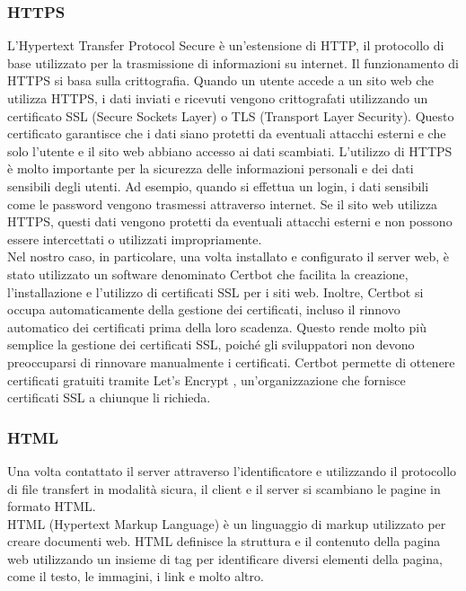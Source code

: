 \documentclass[a4paper,final,12pt]{report}
\begin{document}
\subsubsection{HTTPS}
L'Hypertext Transfer Protocol Secure è un'estensione di HTTP, il protocollo di base utilizzato per la trasmissione di informazioni su internet. Il funzionamento di HTTPS si basa sulla crittografia. Quando un utente accede a un sito web che utilizza HTTPS, i dati inviati e ricevuti vengono crittografati utilizzando un certificato SSL (Secure Sockets Layer) o TLS (Transport Layer Security). Questo certificato garantisce che i dati siano protetti da eventuali attacchi esterni e che solo l'utente e il sito web abbiano accesso ai dati scambiati.
L'utilizzo di HTTPS è molto importante per la sicurezza delle informazioni personali e dei dati sensibili degli utenti. Ad esempio, quando si effettua un login, i dati sensibili come le password vengono trasmessi attraverso internet. Se il sito web utilizza HTTPS, questi dati vengono protetti da eventuali attacchi esterni e non possono essere intercettati o utilizzati impropriamente.\\
Nel nostro caso, in particolare, una volta installato e configurato il server web, è stato utilizzato un software denominato Certbot \cite{Certbot} che facilita la creazione, l'installazione e l'utilizzo di certificati SSL per i siti web. Inoltre, Certbot si occupa automaticamente della gestione dei certificati, incluso il rinnovo automatico dei certificati prima della loro scadenza. Questo rende molto più semplice la gestione dei certificati SSL, poiché gli sviluppatori non devono preoccuparsi di rinnovare manualmente i certificati.
Certbot permette di ottenere certificati gratuiti tramite Let's Encrypt \cite{Let's encrypt}, un'organizzazione che fornisce certificati SSL a chiunque li richieda.\\

\subsubsection{HTML}

Una volta contattato il server attraverso l'identificatore e utilizzando il protocollo di file transfert in modalità sicura, il client e il server si scambiano le pagine in formato HTML.\\
HTML (Hypertext Markup Language) è un linguaggio di markup utilizzato per creare documenti web. HTML definisce la struttura e il contenuto della pagina web utilizzando un insieme di tag per identificare diversi elementi della pagina, come il testo, le immagini, i link e molto altro.
\end{document}
